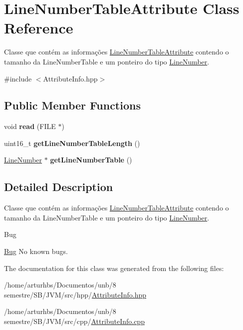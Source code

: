 \hypertarget{classLineNumberTableAttribute}{}\section{Line\+Number\+Table\+Attribute Class Reference}
\label{classLineNumberTableAttribute}


Classe que contém as informações \hyperlink{classLineNumberTableAttribute}{Line\+Number\+Table\+Attribute} contendo o tamanho da Line\+Number\+Table e um ponteiro do tipo \hyperlink{classLineNumber}{Line\+Number}.  




{\ttfamily \#include $<$Attribute\+Info.\+hpp$>$}

\subsection*{Public Member Functions}
\begin{DoxyCompactItemize}
\item 
void {\bfseries read} (F\+I\+LE $\ast$)\hypertarget{classLineNumberTableAttribute_ac9f04f51b04043960f7bdde688ac3b76}{}\label{classLineNumberTableAttribute_ac9f04f51b04043960f7bdde688ac3b76}

\item 
uint16\+\_\+t {\bfseries get\+Line\+Number\+Table\+Length} ()\hypertarget{classLineNumberTableAttribute_affc65d74e03649b1109d106517c831e6}{}\label{classLineNumberTableAttribute_affc65d74e03649b1109d106517c831e6}

\item 
\hyperlink{classLineNumber}{Line\+Number} $\ast$ {\bfseries get\+Line\+Number\+Table} ()\hypertarget{classLineNumberTableAttribute_ac30f06bbc3b2a986c7912379215f68bb}{}\label{classLineNumberTableAttribute_ac30f06bbc3b2a986c7912379215f68bb}

\end{DoxyCompactItemize}


\subsection{Detailed Description}
Classe que contém as informações \hyperlink{classLineNumberTableAttribute}{Line\+Number\+Table\+Attribute} contendo o tamanho da Line\+Number\+Table e um ponteiro do tipo \hyperlink{classLineNumber}{Line\+Number}. 

\begin{DoxyRefDesc}{Bug}
\item[\hyperlink{bug__bug000010}{Bug}]No known bugs. \end{DoxyRefDesc}


The documentation for this class was generated from the following files\+:\begin{DoxyCompactItemize}
\item 
/home/arturhbs/\+Documentos/unb/8 semestre/\+S\+B/\+J\+V\+M/src/hpp/\hyperlink{AttributeInfo_8hpp}{Attribute\+Info.\+hpp}\item 
/home/arturhbs/\+Documentos/unb/8 semestre/\+S\+B/\+J\+V\+M/src/cpp/\hyperlink{AttributeInfo_8cpp}{Attribute\+Info.\+cpp}\end{DoxyCompactItemize}
